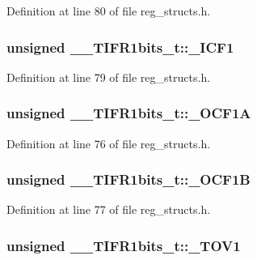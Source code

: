 Definition at line 80 of file reg\+\_\+structs.\+h.

\hypertarget{union_____t_i_f_r1bits__t_accb348df81834691abc7e69761bfd8a7}{
\subsubsection[{\+\_\+\+I\+C\+F1}]{\setlength{\rightskip}{0pt plus 5cm}unsigned \+\_\+\+\_\+\+T\+I\+F\+R1bits\+\_\+t\+::\+\_\+\+I\+C\+F1}}\label{union_____t_i_f_r1bits__t_accb348df81834691abc7e69761bfd8a7}


Definition at line 79 of file reg\+\_\+structs.\+h.

\hypertarget{union_____t_i_f_r1bits__t_aadeab388893a208b9f9edab5b4636a83}{
\subsubsection[{\+\_\+\+O\+C\+F1\+A}]{\setlength{\rightskip}{0pt plus 5cm}unsigned \+\_\+\+\_\+\+T\+I\+F\+R1bits\+\_\+t\+::\+\_\+\+O\+C\+F1\+A}}\label{union_____t_i_f_r1bits__t_aadeab388893a208b9f9edab5b4636a83}


Definition at line 76 of file reg\+\_\+structs.\+h.

\hypertarget{union_____t_i_f_r1bits__t_abd991cb0c124d213eb5b695a367e20b3}{
\subsubsection[{\+\_\+\+O\+C\+F1\+B}]{\setlength{\rightskip}{0pt plus 5cm}unsigned \+\_\+\+\_\+\+T\+I\+F\+R1bits\+\_\+t\+::\+\_\+\+O\+C\+F1\+B}}\label{union_____t_i_f_r1bits__t_abd991cb0c124d213eb5b695a367e20b3}


Definition at line 77 of file reg\+\_\+structs.\+h.

\hypertarget{union_____t_i_f_r1bits__t_ad73c5e16fb3c89b277c98dffff196150}{
\subsubsection[{\+\_\+\+T\+O\+V1}]{\setlength{\rightskip}{0pt plus 5cm}unsigned \+\_\+\+\_\+\+T\+I\+F\+R1bits\+\_\+t\+::\+\_\+\+T\+O\+V1}}\label{union_____t_i_f_r1bits__t_ad73c5e16fb3c89b277c98dffff196150}


